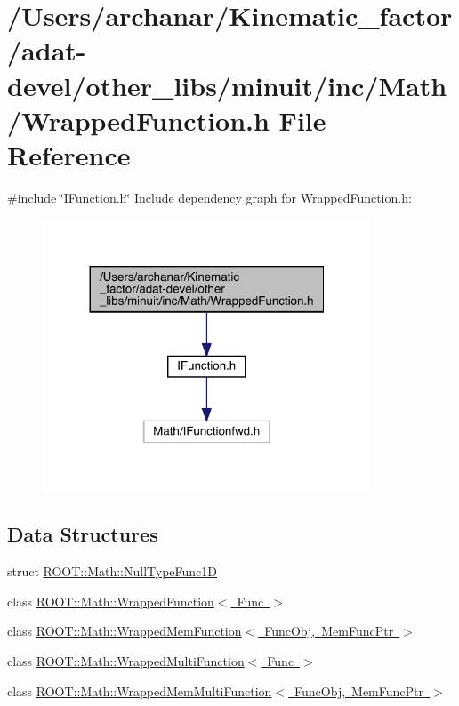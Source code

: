 \hypertarget{adat-devel_2other__libs_2minuit_2inc_2Math_2WrappedFunction_8h}{}\section{/\+Users/archanar/\+Kinematic\+\_\+factor/adat-\/devel/other\+\_\+libs/minuit/inc/\+Math/\+Wrapped\+Function.h File Reference}
\label{adat-devel_2other__libs_2minuit_2inc_2Math_2WrappedFunction_8h}
{\ttfamily \#include \char`\"{}I\+Function.\+h\char`\"{}}\newline
Include dependency graph for Wrapped\+Function.\+h\+:
\nopagebreak
\begin{figure}[H]
\begin{center}
\leavevmode
\includegraphics[width=276pt]{d9/d7f/adat-devel_2other__libs_2minuit_2inc_2Math_2WrappedFunction_8h__incl}
\end{center}
\end{figure}
\subsection*{Data Structures}
\begin{DoxyCompactItemize}
\item 
struct \mbox{\hyperlink{structROOT_1_1Math_1_1NullTypeFunc1D}{R\+O\+O\+T\+::\+Math\+::\+Null\+Type\+Func1D}}
\item 
class \mbox{\hyperlink{classROOT_1_1Math_1_1WrappedFunction}{R\+O\+O\+T\+::\+Math\+::\+Wrapped\+Function$<$ Func $>$}}
\item 
class \mbox{\hyperlink{classROOT_1_1Math_1_1WrappedMemFunction}{R\+O\+O\+T\+::\+Math\+::\+Wrapped\+Mem\+Function$<$ Func\+Obj, Mem\+Func\+Ptr $>$}}
\item 
class \mbox{\hyperlink{classROOT_1_1Math_1_1WrappedMultiFunction}{R\+O\+O\+T\+::\+Math\+::\+Wrapped\+Multi\+Function$<$ Func $>$}}
\item 
class \mbox{\hyperlink{classROOT_1_1Math_1_1WrappedMemMultiFunction}{R\+O\+O\+T\+::\+Math\+::\+Wrapped\+Mem\+Multi\+Function$<$ Func\+Obj, Mem\+Func\+Ptr $>$}}
\end{DoxyCompactItemize}
